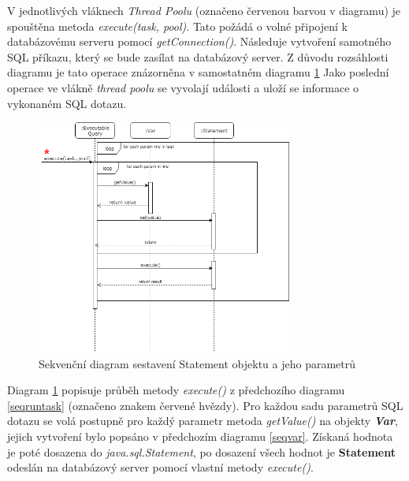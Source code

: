 \documentclass[czech,bachelor,public,dept460,male,cpdeclaration,twoside]{diploma}
\begin{document}
V jednotlivých vláknech \textit{Thread Poolu} (označeno červenou barvou v diagramu) je spouštěna metoda \textit{execute(task, pool)}. Tato požádá o volné připojení k databázovému serveru pomocí \textit{getConnection()}. Následuje vytvoření samotného SQL příkazu, který se bude zasílat na databázový server. Z důvodu rozsáhlosti diagramu je tato operace znázorněna v samostatném diagramu \ref{getvalues} Jako poslední operace ve vlákně \textit{thread poolu} se vyvolají události a uloží se informace o vykonaném SQL dotazu.


\begin{figure}[!htbp]\centering\includegraphics[width=0.75\textwidth]{Figures/getvalues.png}\caption{Sekvenční diagram sestavení Statement objektu a jeho parametrů}
\label{getvalues}
\end{figure}

Diagram \ref{getvalues} popisuje průběh metody \textit{execute()} z předchozího diagramu \ref{seqruntask} (označeno znakem červené hvězdy). Pro každou sadu parametrů SQL dotazu se volá postupně pro každý parametr metoda \textit{getValue()} na objekty \textbf{\emph{Var}}, jejich vytvoření bylo popsáno v předchozím diagramu \ref{seqvar}. Získaná hodnota je poté dosazena do \textit{java.sql.Statement}, po dosazení všech hodnot je \textbf{Statement} odeslán na databázový server pomocí vlastní metody \textit{execute()}.

\newpage
\end{document}
